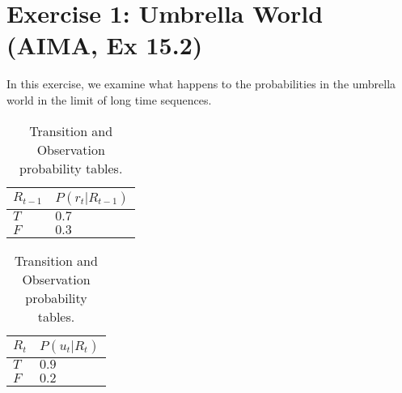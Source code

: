 \documentclass[9pt,a4paper]{extarticle}
\begin{document}
   \section{Exercise 1: Umbrella World (AIMA, Ex 15.2)}
   In this exercise, we examine what happens to the probabilities in the umbrella world in the limit of long time sequences.
   \begin{table}[H]
       \centering
       \begin{tabular}{|l|l|}
       \hline
            $R_{t-1}$ & $P(r_t|R_{t-1})$  \\
            \hline
            $T$ & $0.7$\\
            $F$ & $0.3$\\\hline
       \end{tabular}
       \quad
       \begin{tabular}{|l|l|}
       \hline
            $R_{t}$ & $P(u_t|R_t)$  \\
            \hline
            $T$ & $0.9$\\
            $F$ & $0.2$\\\hline
       \end{tabular}
       \caption{Transition and Observation probability tables.}
       \label{tab:umbrella}
   \end{table}
\end{document}
